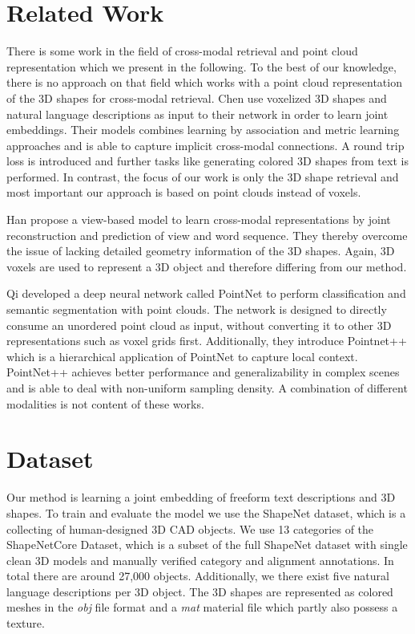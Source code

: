 \documentclass[10pt,twocolumn,letterpaper]{article}
\begin{document}
\section{Related Work}
There is some work in the field of cross-modal retrieval and point cloud representation which we present in the following. To the best of our knowledge, there is no approach on that field which works with a point cloud representation of the 3D shapes for cross-modal retrieval. 
Chen \etal \cite{chen2018text2shape} use voxelized 3D shapes and natural language descriptions as input to their network in order to learn joint embeddings. Their models combines learning by association and metric learning approaches and is able to capture implicit cross-modal connections. A round trip loss is introduced and further tasks like generating colored 3D shapes from text is performed. In contrast, the focus of our work is only the 3D shape retrieval and most important our approach is based on point clouds instead of voxels. 

Han \etal \cite{han2018seq2seq} propose a view-based model to learn cross-modal representations by joint reconstruction and prediction of view and word sequence. They thereby overcome the issue of lacking detailed geometry information of the 3D shapes. Again, 3D voxels are used to represent a 3D object and therefore differing from our method.  

Qi \etal developed a deep neural network called PointNet \cite{qi2017pointnet} to perform classification and semantic segmentation with point clouds. The network is designed to directly consume an unordered point cloud as input, without converting it to other 3D representations such as voxel grids first. Additionally, they introduce Pointnet++ \cite{qi2017Pointnet++} which is a hierarchical application of PointNet to capture local context. PointNet++ achieves better performance and generalizability in complex scenes and is able to deal with non-uniform sampling density. A combination of different modalities is not content of these works. 

\section{Dataset}
Our method is learning a joint embedding of freeform text descriptions and 3D shapes. To train and evaluate the model we use the ShapeNet \cite{Chang2015Shapenet} dataset, which is a collecting of human-designed 3D CAD objects. We use 13 categories of the ShapeNetCore Dataset, which is a subset of the full ShapeNet dataset with single clean 3D models and manually verified category and alignment annotations. In total there are around 27,000 objects. Additionally, we there exist five natural language descriptions per 3D object. The 3D shapes are represented as colored meshes in the \textit{obj} file format and a \textit{mat} material file which partly also possess a texture.
\end{document}
